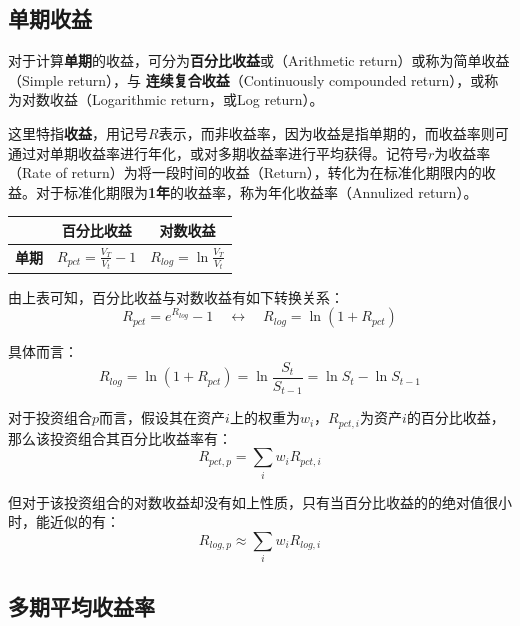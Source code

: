 \documentclass[11pt]{article}
\begin{document}
\subsection{单期收益}

对于计算\textbf{单期}的收益，可分为\textbf{百分比收益}或（Arithmetic return）或称为简单收益（Simple return），与
\textbf{连续复合收益}（Continuously compounded return），或称为对数收益（Logarithmic return，或Log return）。

这里特指\textbf{收益}，用记号$R$表示，而非收益率，因为收益是指单期的，而收益率则可通过对单期收益率进行年化，或对多期收益率进行平均获得。记符号$r$为收益率（Rate of return）为将一段时间的收益（Return），转化为在标准化期限内的收益。对于标准化期限为\textbf{1年}的收益率，称为年化收益率（Annulized return）。
\begin{table}[H]
\centering
\begin{tabular}{@{}cll@{}}
\toprule
\multicolumn{1}{l}{}
& \multicolumn{1}{c}{\textbf{百分比收益}} & \multicolumn{1}{c}{\textbf{对数收益}} \\
\midrule
\multirow{1}{*}{\textbf{单期}} 
& $R_{pct} = \frac{V_T}{V_t}-1$
& $R_{log} = \ln \frac{V_T}{V_t}$ \\
\bottomrule
\end{tabular}
\end{table}

由上表可知，百分比收益与对数收益有如下转换关系：
\begin{equation*}
    R_{pct} = e^{R_{log}} - 1 \quad\leftrightarrow\quad R_{log} = \ln (1+R_{pct}) 
\end{equation*}

具体而言：
\begin{equation*}
    R_{log} = \ln (1 + R_{pct}) = \ln \frac{S_t}{S_{t-1}} = \ln S_t - \ln S_{t-1}
\end{equation*}

对于投资组合$p$而言，假设其在资产$i$上的权重为$w_i$，$R_{pct,i}$为资产$i$的百分比收益，那么该投资组合其百分比收益率有：
\begin{equation*}
    R_{pct,p} = \sum_i w_i R_{pct,i}
\end{equation*}

但对于该投资组合的对数收益却没有如上性质，只有当百分比收益的的绝对值很小时，能近似的有：
\begin{equation*}
    R_{log,p} \approx \sum_i w_i R_{log,i}
\end{equation*}

\subsection{多期平均收益率}
\end{document}
